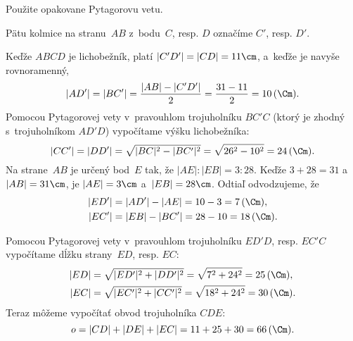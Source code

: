 {%
\napad
Použite opakovane Pytagorovu vetu.

\riesenie
Pätu kolmice na stranu~$AB$ z~bodu~$C$, resp. $D$ označíme $C'$, resp.
$D'$.
%

\noindent
Keďže $ABCD$ je lichobežník, platí $|C'D'|=|CD|=11\cm$, a~keďže je
navyše rovnoramenný,
$$
|AD'|=|BC'|=\frac{|AB|-|C'D'|}2=\frac{31-11}2=10\,(\Cm).
$$
Pomocou Pytagorovej vety v~pravouhlom trojuholníku $BC'C$ (ktorý je
zhodný s~trojuholníkom $AD'D$) vypočítame výšku lichobežníka:
$$
|CC'|=|DD'|=\sqrt{|BC|^2-|BC'|^2}=\sqrt{26^2-10^2}=24\,(\Cm).
$$
Na strane~$AB$ je určený bod~$E$ tak, že $|AE|:|EB|=3:28$.
Keďže $3+28=31$ a~$|AB|=31\cm$, je $|AE|=3\cm$ a~$|EB|=28\cm$.
Odtiaľ odvodzujeme, že
$$
\aligned
\vert ED'\vert &=\vert AD'\vert -\vert AE\vert =10-3=7\,(\Cm),\\
\vert EC'\vert &=\vert EB\vert -\vert BC'\vert =28-10=18\,(\Cm).
\endaligned
$$
%

\noindent
Pomocou Pytagorovej vety v~pravouhlom trojuholníku $ED'D$, resp. $EC'C$
vypočítame dĺžku strany~$ED$, resp. $EC$:
$$
\aligned
\vert ED\vert &=\sqrt{\vert ED'\vert ^2+\vert DD'\vert ^2}=\sqrt{7^2+24^2}=25\,(\Cm),\\
\vert EC\vert &=\sqrt{\vert EC'\vert ^2+\vert CC'\vert ^2}=\sqrt{18^2+24^2}=30\,(\Cm).
\endaligned
$$
Teraz môžeme vypočítať obvod trojuholníka $CDE$:
$$
o=|CD|+|DE|+|EC|=11+25+30=66\,(\Cm).
$$
}


